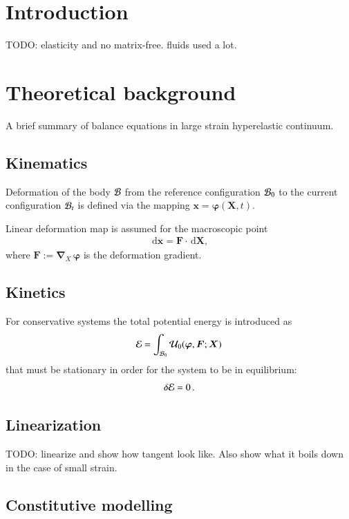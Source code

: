 \documentclass[preprint,12pt,times]{elsarticle}
\def\gz  #1{           \mbox{$\boldsymbol{#1}$}}
\def\d {\,\mbox{d}}
\def\mcl  #1{               {\cal #1}}
\begin{document}
\section{Introduction}

TODO: elasticity and no matrix-free. fluids used a lot.

\section{Theoretical background}

A brief summary of balance equations in large strain hyperelastic continuum.

\subsection{Kinematics}

Deformation of the body $\mcl B$ from the reference configuration $\mcl B_0$ to the current configuration $\mcl B_t$
is defined via the mapping $\gz x = \gz \varphi (\gz X,t)$.

Linear deformation map is assumed for the macroscopic point
\begin{align}
\d \gz x = \gz F \cdot \d \gz X,
\end{align}
where $\gz F := \gz \nabla_{X} \, \gz \varphi$ is the deformation gradient.

\subsection{Kinetics}

For conservative systems the total potential energy is introduced as
\begin{align}
\mcl E = \int_{\mcl B_0} \mcl U_0(\gz \varphi, \gz F; \gz X) \,
\end{align}
that must be stationary in order for the system to be in equilibrium:
\begin{align}
\delta \mcl E = 0 \, .
\label{eq:stationary}
\end{align}

\subsection{Linearization}

TODO: linearize and show how tangent look like.
Also show what it boils down in the case of small strain.

\subsection{Constitutive modelling}
\end{document}
